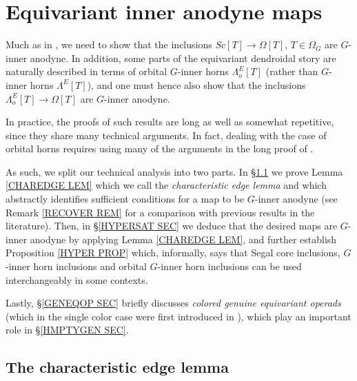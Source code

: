\documentclass[a4paper,10pt
,draft
]{article}%
\begin{document}
\section{Equivariant inner anodyne maps}\label{EQINNERAN SEC}


Much as in \cite[\S 2]{CM13a}, 
we need to show that the inclusions $Sc[T] \to \Omega[T]$, $T\in \Omega_G$ are $G$-inner anodyne.
In addition, some parts of the equivariant dendroidal story are 
naturally described in terms of 
orbital $G$-inner horns $\Lambda^E_o[T]$ 
(rather than $G$-inner horns $\Lambda^E[T]$),
and one must hence also show that the inclusions
$\Lambda^E_o[T] \to \Omega[T]$
are $G$-inner anodyne.

In practice, the proofs of such results are long as well as somewhat repetitive, since they share many technical arguments.
In fact, dealing with the case of orbital horns requires using many of the arguments in the long proof of \cite[Thm 7.1]{Per17}.

As such, we split our technical analysis into two parts.
In \S \ref{CHAREDGE SEC} we prove Lemma \ref{CHAREDGE LEM} which  we call the \textit{characteristic edge lemma} and
which abstractly identifies sufficient conditions for a map to be $G$-inner anodyne
(see Remark \ref{RECOVER REM} for a comparison with previous results in the literature).
Then, in \S \ref{HYPERSAT SEC} we deduce that the desired maps
are $G$-inner anodyne by applying Lemma \ref{CHAREDGE LEM},
and further establish Proposition \ref{HYPER PROP} which,
informally,
says that Segal core inclusions, $G$-inner horn inclusions and orbital $G$-inner horn inclusions can be used interchangeably in some contexts.


Lastly, \S \ref{GENEQOP SEC} briefly discusses \textit{colored genuine equivariant operads}
(which in the single color case were first introduced in \cite{BP17}), which play an important role in \S \ref{HMPTYGEN SEC}.


\subsection{The characteristic edge lemma} \label{CHAREDGE SEC}
\end{document}
